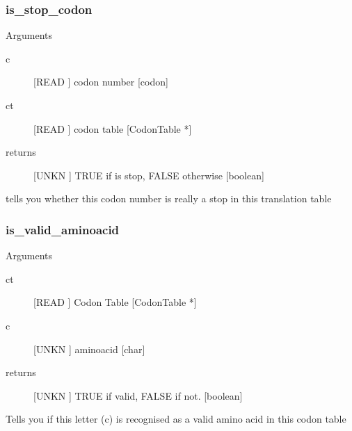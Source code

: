 \subsubsection{is_stop_codon}

Arguments
\begin{description}
\item[c] [READ ] codon number [codon]
\item[ct] [READ ] codon table [CodonTable *]
\item[returns] [UNKN ] TRUE if is stop, FALSE otherwise [boolean]
\end{description}
tells you whether this codon number is really a stop
in this translation table


\subsubsection{is_valid_aminoacid}

Arguments
\begin{description}
\item[ct] [READ ] Codon Table [CodonTable *]
\item[c] [UNKN ] aminoacid [char]
\item[returns] [UNKN ] TRUE if valid, FALSE if not. [boolean]
\end{description}
Tells you if this letter (c) is recognised as a valid amino acid
in this codon table


